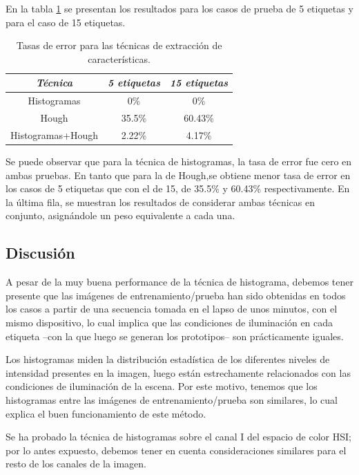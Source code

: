 \documentclass[conference,a4paper,10pt,oneside,final]{tfmpd}
\begin{document}
En la tabla \ref{tablaerrores} se presentan los resultados para
{los casos de prueba} de 5 etiquetas {y para el caso de} 15 etiquetas.
%
%
\begin{table}
\caption{Tasas de error para {las técnicas de extracción de características}.}
\begin{center}\begin{tabular}{ccc}
\hline \emph{{Técnica}} & \emph{5 etiquetas} & \emph{15 etiquetas}\\
\hline Histogramas & 0\% & 0\%\\
\hline Hough & 35.5\% & 60.43\%\\
\hline Histogramas+Hough & 2.22\% & 4.17\%\\
\hline
\end{tabular}\end{center}
\label{tablaerrores}
\end{table}
%
Se puede observar que para {la técnica} de histogramas,
la tasa de error fue cero
en ambas pruebas. En tanto que para {la} de Hough,se obtiene menor tasa de
error {en los casos} de 5 etiquetas que con el de 15, de 35.5\% y 60.43\%
respectivamente. En la última fila, se muestran los resultados de
con\-si\-de\-rar {ambas técnicas}
en conjunto, asignándole un peso equivalente a cada una.
%
%
\subsection{Discusión}
A pesar de la muy buena performance de la técnica de histograma, debemos tener
presente que las  imágenes de entrenamiento/prueba han sido obtenidas
en todos los casos a partir de una secuencia tomada en el
lapso de unos minutos, con el mismo dispositivo, lo cual implica que las
condiciones de iluminación en cada etiqueta --con la que luego se generan
los prototipos-- son prácticamente iguales.

Los histogramas miden la distribución estadística de los diferentes niveles
de intensidad presentes en la imagen, luego están estrechamente relacionados
con las condiciones de iluminación de la escena. Por este motivo, tenemos
que los histogramas entre las imágenes de entrenamiento/prueba son
similares, lo cual explica el buen funcionamiento de este método.

Se ha probado la técnica de histogramas sobre el canal I del espacio de color
HSI; por lo antes expuesto, debemos tener en cuenta consideraciones similares
para el resto de los canales de la imagen.
\end{document}
